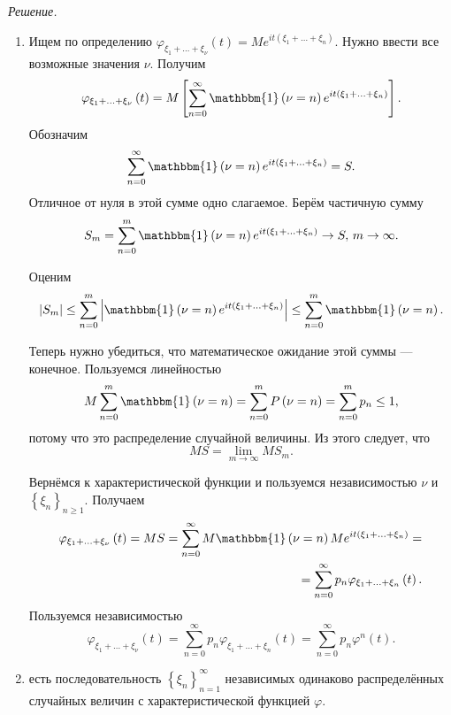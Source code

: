\textit{Решение.}
\begin{enumerate}[label=\alph*)]
\item Ищем по определению $ \varphi_{ \xi_1 + \dotsc + \xi_{ \nu }} \left( t \right) = Me^{it \left( \xi_1 + \dotsc + \xi_n \right) }$.
Нужно ввести все возможные значения $ \nu $.
Получим
$$ \varphi_{ \xi_1 + \dotsc + \xi_{ \nu }} \left( t \right) =
M \left[ \sum \limits_{n=0}^{ \infty } \mathbbm{1} \left( \nu = n \right) e^{it \left( \xi_1 + \dotsc + \xi_n \right) } \right].$$
Обозначим
$$ \sum \limits_{n=0}^{ \infty } \mathbbm{1} \left( \nu = n \right) e^{it \left( \xi_1 + \dotsc + \xi_n \right) } = S.$$
Отличное от нуля в этой сумме одно слагаемое.
Берём частичную сумму
$$S_m =
\sum \limits_{n=0}^m \mathbbm{1} \left( \nu = n \right) e^{it \left( \xi_1 + \dotsc + \xi_n \right) } \rightarrow S, \, m \rightarrow \infty.$$

Оценим
$$ \left| S_m \right| \leq
\sum \limits_{n=0}^m \left| \mathbbm{1} \left( \nu = n \right) e^{it \left( \xi_1 + \dotsc + \xi_n \right) } \right| \leq
\sum \limits_{n=0}^m \mathbbm{1} \left( \nu = n \right).$$

Теперь нужно убедиться, что математическое ожидание этой суммы --- конечное.
Пользуемся линейностью
$$M \sum \limits_{n=0}^m \mathbbm{1} \left( \nu = n \right) =
\sum \limits_{n=0}^m P \left( \nu = n \right) =
\sum \limits_{n=0}^m p_n \leq
1,$$
потому что это распределение случайной величины.
Из этого следует, что
$$MS = \lim \limits_{m \to \infty } MS_m.$$

Вернёмся к характеристической функции и пользуемся независимостью $ \nu $ и $ \left\{ \xi_n \right\}_{n \geq 1}$.
Получаем
\begin{equation*}
\begin{split}
\varphi_{ \xi_1 + \dotsc + \xi_{ \nu }} \left( t \right) =
MS =
\sum \limits_{n=0}^{ \infty } M \mathbbm{1} \left( \nu = n \right) Me^{it \left( \xi_1 + \dotsc + \xi_n \right) } = \\
= \sum \limits_{n=0}^{ \infty } p_n \varphi_{ \xi_1 + \dotsc + \xi_n} \left( t \right).
\end{split}
\end{equation*}
Пользуемся независимостью
$$ \varphi_{ \xi_1 + \dotsc + \xi_{ \nu }} \left( t \right) =
\sum \limits_{n=0}^{ \infty } p_n \varphi_{ \xi_1 + \dotsc + \xi_n} \left( t \right) =
\sum \limits_{n=0}^{ \infty } p_n \varphi^n \left( t \right).$$
\item есть последовательность $ \left\{ \xi_n \right\}_{n = 1}^{ \infty }$ независимых одинаково распределённых случайных величин с характеристической функцией $ \varphi $.


\end{enumerate}
